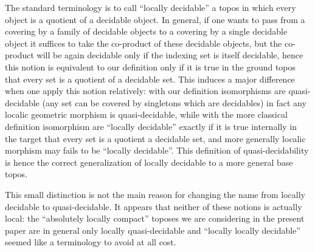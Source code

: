 \documentclass[a4paper]{article}
\newcommand{\blockn}[1]{\par #1 \bigskip}
\begin{document}
\blockn{The standard terminology is to call ``locally decidable'' a topos in which every object is a quotient of a decidable object. In general, if one wants to pass from a covering by a family of decidable objects to a covering by a single decidable object it suffices to take the co-product of these decidable objects, but the co-product will be again decidable only if the indexing set is itself decidable, hence this notion is equivalent to our definition only if it is true in the ground topos that every set is a quotient of a decidable set. This induces a major difference when one apply this notion relatively: with our definition isomorphisms are quasi-decidable (any set can be covered by singletons which are decidables) in fact any localic geometric morphism is quasi-decidable, while with the more classical definition isomorphism are ``locally decidable'' exactly if it is true internally in the target that every set is a quotient a decidable set, and more generally localic morphism may fails to be ``locally decidable''. This definition of quasi-decidability is hence the correct generalization of locally decidable to a more general base topos. 


\bigskip

This small distinction is not the main reason for changing the name from locally decidable to quasi-decidable. It appears that neither of these notions is actually local: the ``absolutely locally compact'' toposes we are considering in the present paper are in general only locally quasi-decidable and ``locally locally decidable'' seemed like a terminology to avoid at all cost.

}
\end{document}
